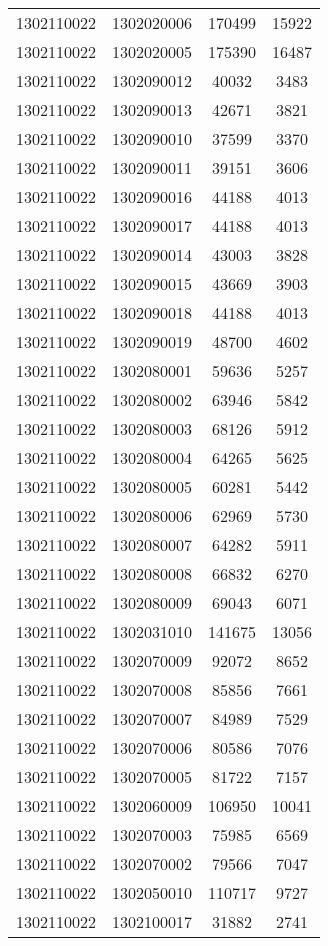 \begin{longtable}[h]{llcc}
		1302110022 & 1302020006 & 170499 & 15922\\
		1302110022 & 1302020005 & 175390 & 16487\\
		1302110022 & 1302090012 & 40032 & 3483\\
		1302110022 & 1302090013 & 42671 & 3821\\
		1302110022 & 1302090010 & 37599 & 3370\\
		1302110022 & 1302090011 & 39151 & 3606\\
		1302110022 & 1302090016 & 44188 & 4013\\
		1302110022 & 1302090017 & 44188 & 4013\\
		1302110022 & 1302090014 & 43003 & 3828\\
		1302110022 & 1302090015 & 43669 & 3903\\
		1302110022 & 1302090018 & 44188 & 4013\\
		1302110022 & 1302090019 & 48700 & 4602\\
		1302110022 & 1302080001 & 59636 & 5257\\
		1302110022 & 1302080002 & 63946 & 5842\\
		1302110022 & 1302080003 & 68126 & 5912\\
		1302110022 & 1302080004 & 64265 & 5625\\
		1302110022 & 1302080005 & 60281 & 5442\\
		1302110022 & 1302080006 & 62969 & 5730\\
		1302110022 & 1302080007 & 64282 & 5911\\
		1302110022 & 1302080008 & 66832 & 6270\\
		1302110022 & 1302080009 & 69043 & 6071\\
		1302110022 & 1302031010 & 141675 & 13056\\
		1302110022 & 1302070009 & 92072 & 8652\\
		1302110022 & 1302070008 & 85856 & 7661\\
		1302110022 & 1302070007 & 84989 & 7529\\
		1302110022 & 1302070006 & 80586 & 7076\\
		1302110022 & 1302070005 & 81722 & 7157\\
		1302110022 & 1302060009 & 106950 & 10041\\
		1302110022 & 1302070003 & 75985 & 6569\\
		1302110022 & 1302070002 & 79566 & 7047\\
		1302110022 & 1302050010 & 110717 & 9727\\
		1302110022 & 1302100017 & 31882 & 2741\\

\end{longtable}
